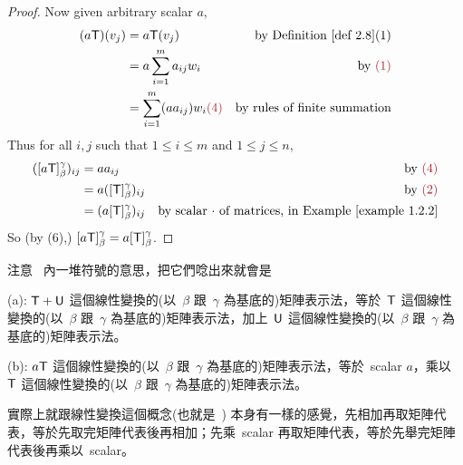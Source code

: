 \begin{proof}
Now given arbitrary scalar \(a\),
\begin{align*}
    (a\T)(v_j) & = a\T(v_j) & \text{by \DEF{2.8}(1)} \\
                   & = a\sum_{i = 1}^m a_{ij} w_i & \text{by \MAROON{(1)}} \\
                   & = \sum_{i = 1}^m (a a_{ij}) w_i \MAROON{(4)} & \text{by rules of finite summation}
\end{align*}
Thus for all \(i, j\) such that \(1 \le i \le m\) and \(1 \le j \le n\),
\begin{align*}
    ([a\T]_{\beta}^{\gamma})_{ij} & = a a_{ij} & \text{by \MAROON{(4)}} \\
                                  & = a([\T]_{\beta}^{\gamma})_{ij} & \text{by \MAROON{(2)}} \\
                                      & = (a[\T]_{\beta}^{\gamma})_{ij} & \text{by scalar \(\cdot\) of matrices, in \EXAMPLE{1.2.2}}
\end{align*}
So (by (6),) \([a\textsf{T}]_{\beta}^{\gamma} = a[\textsf{T}]_{\beta}^{\gamma}\).
\end{proof}

\begin{note}
注意\  內一堆符號的意思，把它們唸出來就會是

(a): \(\textsf{T} + \textsf{U}\) 這個線性變換的(以\ \(\beta\) 跟\ \(\gamma\) 為基底的)矩陣表示法，等於\ \(\textsf{T}\) 這個線性變換的(以\ \(\beta\) 跟\ \(\gamma\) 為基底的)矩陣表示法，加上\ \(\textsf{U}\) 這個線性變換的(以\ \(\beta\) 跟\ \(\gamma\) 為基底的)矩陣表示法。

(b): \(a\textsf{T}\) 這個線性變換的(以\ \(\beta\) 跟\ \(\gamma\) 為基底的)矩陣表示法，等於\ scalar \(a\)，乘以\ \(\textsf{T}\) 這個線性變換的(以\ \(\beta\) 跟\ \(\gamma\) 為基底的)矩陣表示法。

實際上就跟線性變換這個概念(也就是\ ) 本身有一樣的感覺，先相加再取矩陣代表，等於先取完矩陣代表後再相加；先乘\ scalar 再取矩陣代表，等於先舉完矩陣代表後再乘以\ scalar。
\end{note}

